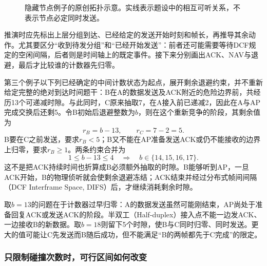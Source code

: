 \begin{figure}[htbp]
\centering
{}
\caption{隐藏节点例子的原创拓扑示意。实线表示题设中的相互可听关系，不表示节点必定同时发送。}
\label{fig:p4-hidden}
\end{figure}

推演时应先标出上层分组到达、已经给定的发送开始时刻和帧长，再推导其余动作。尤其要区分“收到待发分组”和“已经开始发送”：前者还可能需要等待DCF规定的空闲间隔，后者则是时间轴上的既定事件。接下来分别画出ACK、NAV与退避，最后才比较谁的计数器先归零。

第三个例子以下列已经确定的中间计数状态为起点，展开剩余退避约束，并不重新给定完整的绝对到达时间题干：B在A的数据发送及ACK附近的危险边界前，共经历13个可递减时隙。与此同时，C原来抽取7，在A接入前已递减2，因此在A与AP完成交换后还剩5。令B初始后退避整数为$b$，则在这个重新竞争的阶段，其剩余值为
\begin{equation}
 r_B=b-13,\qquad r_C=7-2=5.
\end{equation}
B要在C之前发送，要求$r_B<5$；B又不能在AP准备发送ACK或仍不能接收的边界上归零，要求$r_B\geq1$。两条约束合并为
\begin{equation}
 1\leq b-13\leq4
 \quad\Longrightarrow\quad b\in\{14,15,16,17\}.
\end{equation}
这不是把ACK持续时间也折算成B必须额外抽取的时隙。B能够听到AP，一旦ACK开始，B的物理侦听就会使剩余退避冻结；ACK结束并经过分布式帧间间隔（DCF Interframe Space, DIFS）后，才继续消耗剩余时隙。

取$b=13$的问题在于计数器过早归零：A的数据发送虽然可能刚结束，AP尚处于准备回复ACK或发送ACK的阶段。半双工（Half-duplex）接入点不能一边发ACK、一边接收B的新数据。取$b=18$则留下5个时隙，使B与C同时归零、同时发送。更大的值可能让C先发送而B随后成功，但不能满足“B的两帧都先于C完成”的限定。

\subsubsection{只限制碰撞次数时，可行区间如何改变}

